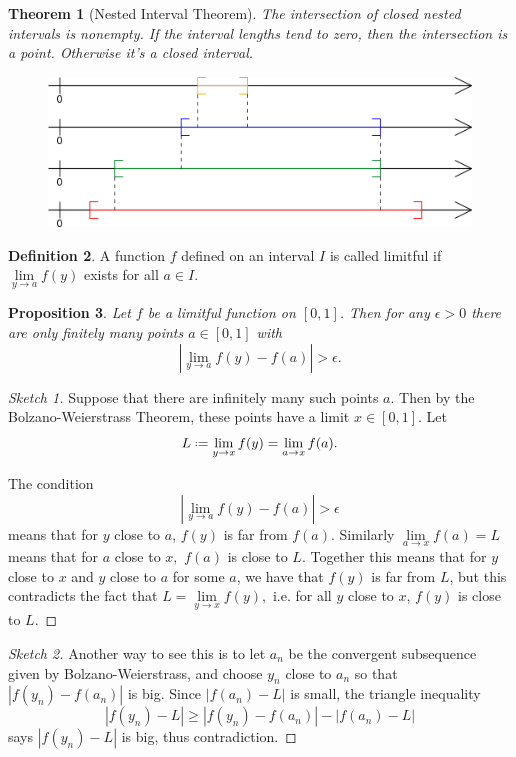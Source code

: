 \documentclass[12pt]{article}
\theoremstyle{plain}
\newtheorem{theorem}{Theorem}
\newtheorem{proposition}[theorem]{Proposition}
\theoremstyle{definition}
\newtheorem{definition}[theorem]{Definition}
\theoremstyle{remark}
\newcommand*{\defeq}{\mathrel{\vcenter{\baselineskip0.5ex \lineskiplimit0pt
                     \hbox{\scriptsize.}\hbox{\scriptsize.}}}
                     =}
\begin{document}
\begin{theorem}[Nested Interval Theorem]
The intersection of closed nested intervals is nonempty. If the interval lengths tend to zero, then the intersection is a point. Otherwise it's a closed interval.
\end{theorem}

\begin{figure}[H]
\centering
\includegraphics[width=1.0\textwidth]{511px-Illustration_nested_intervals}
\end{figure}

\begin{definition}
A function $f$ defined on an interval $I$ is called limitful if $\lim\limits_{y\to a} f(y)$ exists for all $a \in I$.
\end{definition}

\begin{proposition}
Let $f$ be a limitful function on $[0, 1]$. Then for any $\epsilon > 0$ there are only finitely many points $a \in [0, 1]$ with $$|\lim\limits_{y\to a} f(y) - f(a)| > \epsilon.$$
\end{proposition}

\begin{proof}[Sketch 1]
Suppose that there are infinitely many such points $a.$ Then by the Bolzano-Weierstrass Theorem, these points have a limit $x \in [0, 1].$ Let $$L \defeq \lim\limits_{y \to x} f(y) = \lim\limits_{a\to x} f(a).$$

The condition $$|\lim\limits_{y\to a} f(y) - f(a)| > \epsilon$$ means that for $y$ close to $a$, $f(y)$ is far from $f(a).$ Similarly $\lim\limits_{a \to x} f(a) = L$ means that for $a$ close to $x,$ $f(a)$ is close to $L.$ Together this means that for $y$ close to $x$ and $y$ close to $a$ for some $a$, we have that $f(y)$ is far from $L$, but this contradicts the fact that $L = \lim\limits_{y \to x} f(y),$ i.e. for all $y$ close to $x$, $f(y)$ is close to $L.$
\end{proof}

\begin{proof}[Sketch 2]
Another way to see this is to let $a_n$ be the convergent subsequence given by Bolzano-Weierstrass, and choose $y_n$ close to $a_n$ so that $|f(y_n) - f(a_n)|$ is big. Since $|f(a_n) - L|$ is small, the triangle inequality 
$$|f(y_n) - L| \geq |f(y_n) - f(a_n)| - |f(a_n) - L|$$ 
says $|f(y_n) - L|$ is big, thus contradiction.
\end{proof}
\end{document}
